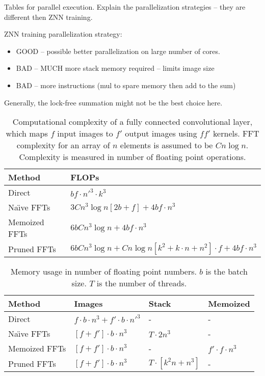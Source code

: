 \documentclass{article}
\begin{document}
Tables for parallel execution.  Explain the parallelization strategies
-- they are different then ZNN training.

ZNN training parallelization strategy:

\begin{itemize}
\item GOOD -- possible better parallelization on large number of cores.
\item BAD -- MUCH more stack memory required -- limits image size
\item BAD -- more instructions (mul to spare memory then add to the sum)
\end{itemize}

Generally, the lock-free summation might not be the best choice here.

\begin{table}
  \centering
  \begin{tabular}{ll}
    \hline
    Method    &FLOPs
    \\ \hline
    Direct & $bf \cdot n'^3 \cdot k^3$
    \\
    Na\"{\i}ve FFTs & $3Cn^3 \log n[2b + f] + 4b f \cdot n^3$
    \\
    Memoized FFTs & $6bCn^3 \log n + 4b f \cdot n^3$
    \\
    Pruned FFTs & $6bCn^3 \log n + C n\log n[k^2 + k \cdot n + n^2] \cdot f + 4b f \cdot n^3$
    \\ \hline
  \end{tabular}
  \caption{Computational complexity of a fully connected convolutional
    layer, which maps $f$ input images to $f'$ output images using
    $ff'$ kernels. FFT complexity for an array of $n$ elements is
    assumed to be $Cn\log n$.  Complexity is measured in number of
    floating point operations.}
  \label{table:conv_complexity}
\end{table}


\begin{table}
  \centering
  \begin{tabular}{llll}
    \hline
    Method    &Images   &Stack   &Memoized
    \\ \hline
    Direct & $f \cdot b \cdot n^3 + f' \cdot b \cdot n'^3$ & - & -
    \\
    Na\"{\i}ve FFTs & $[f + f'] \cdot b \cdot  n^3$ & $T \cdot 2n^3$ & -
    \\
    Memoized FFTs & $[f + f'] \cdot b \cdot  n^3$ & - & $f' \cdot f \cdot n^3$
    \\
    Pruned FFTs & $[f + f'] \cdot b \cdot  n^3$ & $T \cdot [k^2n + n^3]$ & -
    \\ \hline
  \end{tabular}
  \caption{Memory usage in number of floating point numbers. $b$ is
    the batch size.  $T$ is the number of threads.}
  \label{table:conv_memory}
\end{table}
\end{document}

